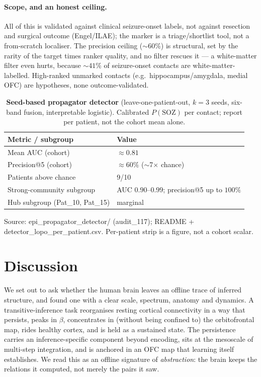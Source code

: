 \documentclass[11pt]{article}
\begin{document}
\paragraph{Scope, and an honest ceiling.}
All of this is validated against clinical seizure-onset labels, not against
resection and surgical outcome (Engel/ILAE); the marker is a triage/shortlist
tool, not a from-scratch localiser. The precision ceiling ($\sim60\%$) is
structural, set by the rarity of the target times ranker quality, and no filter
rescues it --- a white-matter filter even hurts, because $\sim41\%$ of
seizure-onset contacts are white-matter-labelled. High-ranked unmarked contacts
(e.g.\ hippocampus/amygdala, medial OFC) are hypotheses, none outcome-validated.

\begin{table}[t]
\centering
\caption{\textbf{Seed-based propagator detector} (leave-one-patient-out,
$k=3$ seeds, six-band fusion, interpretable logistic). Calibrated $P(\mathrm{SOZ})$
per contact; report per patient, not the cohort mean alone.}
\label{tab:detector}
\begin{tabular}{ll}
\toprule
Metric / subgroup & Value \\
\midrule
Mean AUC (cohort)                 & $\approx0.81$ \\
Precision@5 (cohort)              & $\approx60\%$ ($\sim$7$\times$ chance) \\
Patients above chance             & 9/10 \\
Strong-community subgroup         & AUC $0.90$--$0.99$; precision@5 up to $100\%$ \\
Hub subgroup (Pat\_10, Pat\_15)   & marginal \\
\bottomrule
\end{tabular}
\par\smallskip
{\footnotesize Source: epi\_propagator\_detector/ (audit\_117);
README + detector\_lopo\_per\_patient.csv. Per-patient strip is a figure, not a
cohort scalar.}
\end{table}

\section{Discussion}

We set out to ask whether the human brain leaves an offline trace of inferred
structure, and found one with a clear scale, spectrum, anatomy and dynamics. A
transitive-inference task reorganises resting cortical connectivity in a way that
persists, peaks in $\beta$, concentrates in (without being confined to) the
orbitofrontal map, rides healthy cortex, and is held as a sustained state. The
persistence carries an inference-specific component beyond encoding, sits at the
mesoscale of multi-step integration, and is anchored in an OFC map that learning
itself establishes. We read this as an offline signature of \emph{abstraction}:
the brain keeps the relations it computed, not merely the pairs it saw.
\end{document}

